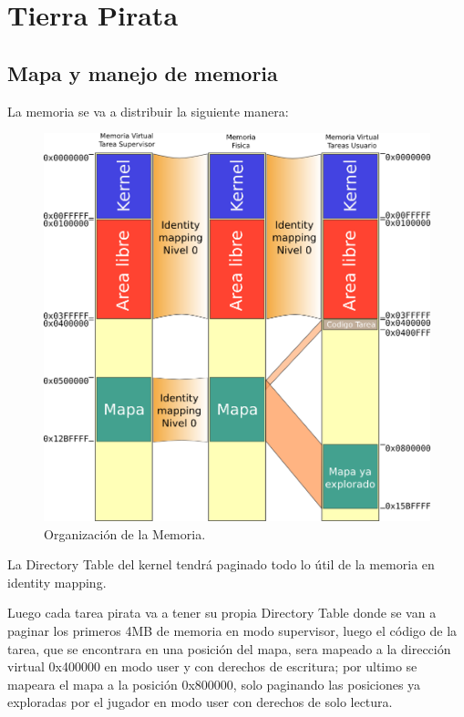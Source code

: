 \section{Tierra Pirata}

\subsection{Mapa y manejo de memoria}

La memoria se va a distribuir la siguiente manera:

\begin{figure}[H]
	\begin{center}
		\includegraphics[scale=0.45]{images/MemoriaVirtual.png}
		\caption{Organización de la Memoria.}
		\label{fig:memoria}
	\end{center}
\end{figure}

La Directory Table del kernel tendrá paginado todo lo útil de la memoria en identity mapping.

Luego cada tarea pirata va a tener su propia Directory Table donde se van a paginar los primeros 4MB de memoria en modo supervisor, luego el código de la tarea, que se encontrara en una posición del mapa, sera mapeado a la dirección virtual 0x400000 en modo user y con derechos de escritura; por ultimo se mapeara el mapa a la posición 0x800000, solo paginando las posiciones ya exploradas por el jugador en modo user con derechos de solo lectura.

